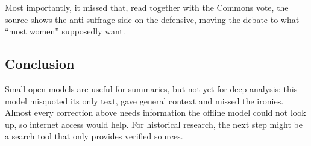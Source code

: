 Most importantly, it missed that, read together with the Commons vote, the source shows the anti-suffrage side on the defensive, moving the debate to what \enquote{most women} supposedly want.

\subsection{Conclusion}

Small open models are useful for summaries, but not yet for deep analysis: this model misquoted its only text, gave general context and missed the ironies.
Almost every correction above needs information the offline model could not look up, so internet access would help.
For historical research, the next step might be a search tool that only provides verified sources.
